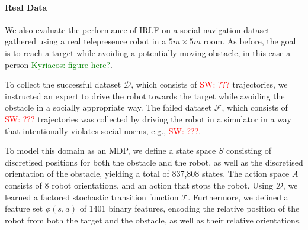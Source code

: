 \documentclass[letterpaper]{article}
\newcommand{\sw}[1]{\textcolor{red}{SW: #1}}
\newcommand{\jm}[1]{\textcolor{blue}{Joao: #1}}
\newcommand{\ks}[1]{\textcolor{green}{Kyriacos: #1}}
\newcommand{\sw}[1]{}
\newcommand{\jm}[1]{}
\newcommand{\ks}[1]{}
\begin{document}


\vspace{-4mm}
\paragraph{Real Data}
We also evaluate the performance of IRLF on a social navigation dataset gathered using a real telepresence robot in a $5m \times 5m$ room.  As before, the goal is to reach a target while avoiding a potentially moving obstacle, in this case a person \ks{figure here?}. 

To collect the successful dataset $\mathcal{D}$, which consists of \sw{???} trajectories, we instructed an expert to drive the robot towards the target while avoiding the obstacle in a socially appropriate way. The failed dataset $\mathcal{F}$, which consists of \sw{???} trajectories was collected by driving the robot in a simulator in a way that intentionally violates social norms, e.g., \sw{???}.

To model this domain as an MDP, we define a state space $S$ consisting of discretised positions for both the obstacle and the robot, as well as the discretised orientation of the obstacle, yielding a total of 837,808 states. The action space $A$ consists of 8 robot orientations, and an action that stops the robot. Using $\mathcal{D}$, we learned a factored stochastic transition function $\mathcal{T}$. Furthermore, we defined a feature set $\phi(s,a)$ of 1401 binary features, encoding the relative position of the robot from both the target and the obstacle, as well as their relative orientations. \\
\end{document}
